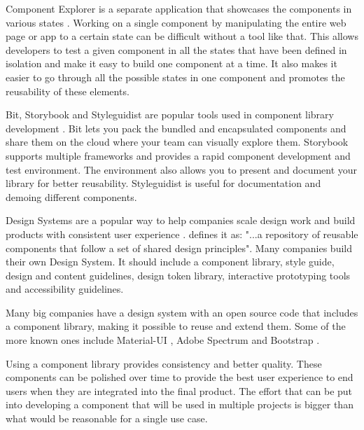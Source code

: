 \documentclass{master_thesis}
\begin{document}
Component Explorer is a separate application that showcases the components in various states \citep{Coleman2017}. Working on a single component by manipulating the entire web page or app to a certain state can be difficult without a tool like that. This allows developers to test a given component in all the states that have been defined in isolation and make it easy to build one component at a time. It also makes it easier to go through all the possible states in one component and promotes the reusability of these elements.

Bit, Storybook and Styleguidist are popular tools used in component library development \citep{Ella2019}. Bit lets you pack the bundled and encapsulated components and share them on the cloud where your team can visually explore them. Storybook supports multiple frameworks and provides a rapid component development and test environment. The environment also allows you to present and document your library for better reusability. Styleguidist is useful for documentation and demoing different components.

Design Systems are a popular way to help companies scale design work and build products with consistent user experience \citep{Yew2020}. \citeauthor{Yew2020} defines it as: "...a repository of reusable components that follow a set of shared design principles". Many companies build their own Design System. It should include a component library, style guide, design and content guidelines, design token library, interactive prototyping tools and accessibility guidelines.

Many big companies have a design system with an open source code that includes a component library, making it possible to reuse and extend them. Some of the more known ones include Material-UI \citep{MUS}, Adobe Spectrum \citep{Adobe} and Bootstrap \citep{Collings}.




Using a component library provides consistency and better quality. These components can be polished over time to provide the best user experience to end users when they are integrated into the final product. The effort that can be put into developing a component that will be used in multiple projects is bigger than what would be reasonable for a single use case.
\end{document}
